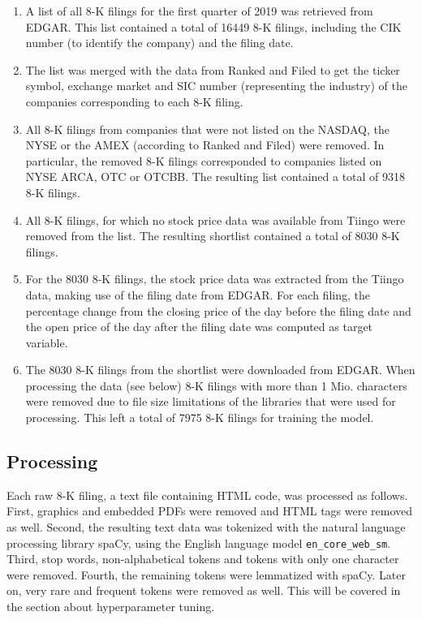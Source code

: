 \documentclass{article}
\begin{document}
	\begin{enumerate}
		\item A list of all 8-K filings for the first quarter of 2019 was retrieved from EDGAR. This list contained a total of 16449 8-K filings, including the CIK number (to identify the company) and the filing date.
		\item The list was merged with the data from Ranked and Filed to get the ticker symbol, exchange market and SIC number (representing the industry) of the companies corresponding to each 8-K filing.
		\item All  8-K filings from companies that were not listed on the NASDAQ, the NYSE or the AMEX (according to Ranked and Filed) were removed. In particular, the removed 8-K filings corresponded to companies listed on NYSE ARCA, OTC or OTCBB. The resulting list contained a total of 9318 8-K filings.
		\item All 8-K filings, for which no stock price data was available from Tiingo were removed from the list. The resulting shortlist contained a total of 8030 8-K filings. 
		\item For the 8030 8-K filings, the stock price data was extracted from the Tiingo data, making use of the filing date from EDGAR. For each filing, the percentage change from the closing price of the day before the filing date and the open price of the day after the filing date was computed as target variable.
		\item The 8030 8-K filings from the shortlist were downloaded from EDGAR. When processing the data (see below) 8-K filings with more than 1 Mio. characters were removed due to file size limitations of the libraries that were used for processing. This left a total of 7975 8-K filings for training the model.
	\end{enumerate}
	
	\subsection{Processing}
	
	Each raw 8-K filing, a text file containing HTML code, was processed as follows. First, graphics and embedded PDFs were removed and HTML tags were removed as well. Second, the resulting text data was tokenized with the natural language processing library spaCy, using the English language model \lstinline{en_core_web_sm}. Third, stop words, non-alphabetical tokens and tokens with only one character were removed. Fourth, the remaining tokens were lemmatized with spaCy. Later on, very rare and frequent tokens were removed as well. This will be covered in the section about hyperparameter tuning. 
	
\end{document}
